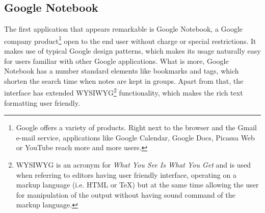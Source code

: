 \subsection{Google Notebook}\label{subsec:google_notebook}
The first application that appears remarkable is Google Notebook, a Google company product\footnote{Google offers a variety of products. Right next to the browser and the Gmail e-mail service, applications like Google Calendar, Google Docs, Picassa Web or YouTube reach more and more users.} open to the end user without charge or special restrictions. It makes use of typical Google design patterns, which makes its usage naturally easy for users familiar with other Google applications. What is more, Google Notebook has a number standard elements like bookmarks and tags, which shorten the search time when notes are kept in groups. Apart from that, the interface has extended WYSIWYG\footnote{WYSIWYG is an acronym for \textit{What You See Is What You Get} and is used when referring to editors having user friendly interface, operating on a markup language (i.e. HTML or \TeX) but at the same time allowing the user for manipulation of the output without having sound command of the markup language.} functionality, which makes the rich text formatting user friendly.


